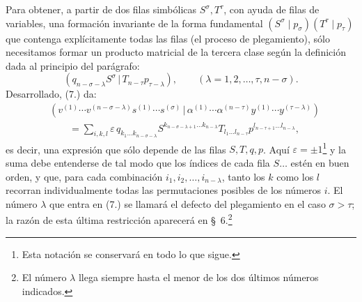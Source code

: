 \documentclass[11pt]{article}
\newcommand{\pair}[2]{(#1\,|\,#2)}
\newcommand{\eps}{\varepsilon}
\begin{document}
Para obtener, a partir de dos filas simbólicas $S^\sigma,T^\tau$, con ayuda de filas de variables, una formación invariante de la forma fundamental $(S^\sigma\mid p_\sigma)(T^\tau\mid p_\tau)$ que contenga explícitamente todas las filas (el proceso de plegamiento), sólo necesitamos formar un producto matricial de la tercera clase según la definición dada al principio del parágrafo:
\begin{equation}
 \pair{q_{n-\sigma-\lambda}S^\sigma}{T_{n-\tau}p_{\tau-\lambda}},
 \qquad (\lambda=1,2,\ldots,\tau,n-\sigma).
\tag{7}
\end{equation}
Desarrollado, (7.) da:
\begin{equation}
\begin{aligned}
&\pair{v^{(1)}\cdots v^{(n-\sigma-\lambda)}s^{(1)}\cdots s^{(\sigma)}}
       {\alpha^{(1)}\cdots\alpha^{(n-\tau)}y^{(1)}\cdots y^{(\tau-\lambda)}} \\
&\qquad =\sum_{i,k,l}\eps\,q_{k_1\ldots k_{n-\sigma-\lambda}}
 S^{k_{n-\sigma-\lambda+1}\ldots k_{n-\lambda}}
 T_{l_1\ldots l_{n-\tau}}
 p^{l_{n-\tau+1}\ldots l_{n-\lambda}},
\end{aligned}
\tag{8}
\end{equation}
es decir, una expresión que sólo depende de las filas $S,T,q,p$. Aquí $\eps=\pm1$\footnote{Esta notación se conservará en todo lo que sigue.} y la suma debe entenderse de tal modo que los índices de cada fila $S\ldots$ estén en buen orden, y que, para cada combinación $i_1,i_2,\ldots,i_{n-\lambda}$, tanto los $k$ como los $l$ recorran individualmente todas las permutaciones posibles de los números $i$. El número $\lambda$ que entra en (7.) se llamará el defecto del plegamiento en el caso $\sigma>\tau$; la razón de esta última restricción aparecerá en \S\ 6.\footnote{El número $\lambda$ llega siempre hasta el menor de los dos últimos números indicados.}
\end{document}
